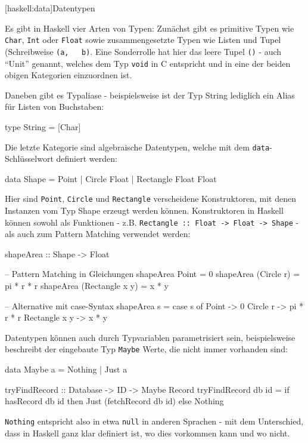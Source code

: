 \documentclass[11pt, a4paper, bibgerm]{book}
\newcommand\icode[1]{\lstinline?#1?}
\newcommand\lsection{}
\begin{document}
\lsection[haskell:data]{Datentypen}

Es gibt in Haskell vier Arten von Typen: Zunächst gibt es primitive
Typen wie \icode{Char}, \icode{Int} oder \icode{Float} sowie
zusammengesetzte Typen wie Listen und Tupel (Schreibweise \icode{(a,
  b)}. Eine Sonderrolle hat hier das leere Tupel \icode{()} - auch
"`Unit"' genannt, welches dem Typ \icode{void} in C entspricht und in
eine der beiden obigen Kategorien einzuordnen ist.

Daneben gibt es Typaliase - beispielsweise ist der Typ String lediglich
ein Alias für Listen von Buchstaben:
\begin{code}
type String = [Char]
\end{code}

Die letzte Kategorie sind algebraische Datentypen, welche mit dem
\icode{data}-Schlüsselwort definiert werden:
\begin{code}
data Shape = Point
           | Circle Float
           | Rectangle Float Float
\end{code}
Hier sind \icode{Point}, \icode{Circle} und \icode{Rectangle}
verscheidene Konstruktoren, mit denen Instanzen vom Typ Shape erzeugt
werden können. Konstruktoren in Haskell können sowohl als Funktionen -
z.B. \icode{Rectangle :: Float -> Float -> Shape} - als auch zum Pattern
Matching verwendet werden:
\begin{code}
shapeArea :: Shape -> Float

-- Pattern Matching in Gleichungen
shapeArea Point           = 0
shapeArea (Circle r)      = pi * r * r
shapeArea (Rectangle x y) = x * y

-- Alternative mit case-Syntax
shapeArea s = case s of
                Point         -> 0
                Circle r      -> pi * r * r
                Rectangle x y -> x * y
\end{code}

Datentypen können auch durch Typvariablen parametrisiert sein,
beispielsweise beschreibt der eingebaute Typ \icode{Maybe} Werte, die
nicht immer vorhanden sind:
\begin{code}
data Maybe a = Nothing | Just a

tryFindRecord :: Database -> ID -> Maybe Record
tryFindRecord db id = if hasRecord db id
                      then
                        Just (fetchRecord db id)
                      else
                        Nothing
\end{code}
\icode{Nothing} entspricht also in etwa \icode{null} in anderen Sprachen
- mit dem Unterschied, dass in Haskell ganz klar definiert ist, wo dies
vorkommen kann und wo nicht.
\end{document}
